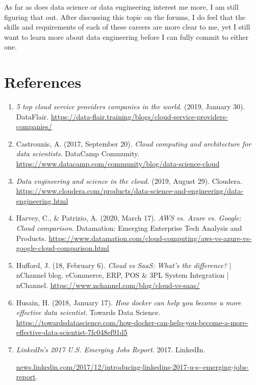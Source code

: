 \documentclass[]{article}
\begin{document}
As far as does data science or data engineering interest me more, I am still figuring that out.  After discussing this topic on the forums, I do feel that the skills and requirements of each of these careers are more clear to me, yet I still want to learn more about data engineering before I can fully commit to either one.  
\section{References}
\begin{enumerate}
	\item \textit{5 top cloud service providers companies in the world.} (2019, January 30). DataFlair. \url{https://data-flair.training/blogs/cloud-service-providers-companies/}
	
	\item Castrounis, A. (2017, September 20). \textit{Cloud computing and architecture for data scientists}. DataCamp Community. \url{https://www.datacamp.com/community/blog/data-science-cloud}
	
	\item \textit{Data engineering and science in the cloud.} (2019, August 29). Cloudera. \url{https://www.cloudera.com/products/data-science-and-engineering/data-engineering.html}
	
	\item Harvey, C., \& Patrizio, A. (2020, March 17). \textit{AWS vs. Azure vs. Google: Cloud comparison}. Datamation: Emerging Enterprise Tech Analysis and Products. \url{https://www.datamation.com/cloud-computing/aws-vs-azure-vs-google-cloud-comparison.html}
	
	\item Hufford, J. (18, February 6). \textit{Cloud vs SaaS: What's the difference?} | nChannel blog. eCommerce, ERP, POS \& 3PL System Integration | nChannel. \url{https://www.nchannel.com/blog/cloud-vs-saas/}
	
	\item Husain, H. (2018, January 17). \textit{How docker can help you become a more effective data scientist}. Towards Data Science. \url{https://towardsdatascience.com/how-docker-can-help-you-become-a-more-effective-data-scientist-7fc048ef91d5}
	
	\item \textit{LinkedIn's 2017 U.S. Emerging Jobs Report}. 2017. LinkedIn. 
	
	\url{news.linkedin.com/2017/12/introducing-linkedins-2017-u-s--emerging-jobs-report}.
	

\end{enumerate}
\end{document}
